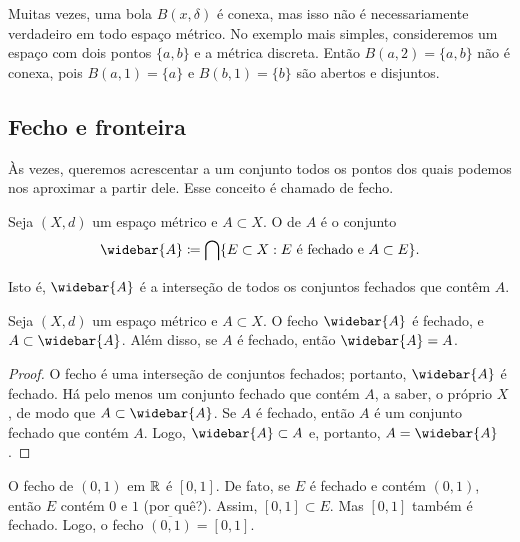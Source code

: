\begin{example}
Muitas vezes, uma bola $B(x,\delta)$ é conexa, mas isso não é necessariamente
verdadeiro em todo espaço métrico.
No exemplo mais simples, consideremos um espaço com dois pontos
$\{ a, b\}$ e a métrica discreta.
Então $B(a,2) = \{ a , b \}$ não é conexa, pois $B(a,1) = \{ a \}$ e
$B(b,1) = \{ b \}$ são abertos e disjuntos.
\end{example}

\subsection{Fecho e fronteira}

Às vezes, queremos acrescentar a um conjunto todos os pontos dos quais
podemos nos aproximar a partir dele. Esse conceito é chamado de fecho.

\begin{defn}
Seja $(X,d)$ um espaço métrico e $A \subset X$.
O \emph{} de $A$ é o conjunto
\begin{equation*}
\widebar{A} \coloneqq \bigcap \{ E \subset X : E \text{ é fechado e } A \subset
E \} .
\end{equation*}
\end{defn}

Isto é,
$\widebar{A}$ é a interseção de todos os conjuntos fechados que contêm $A$.

\begin{prop}
Seja $(X,d)$ um espaço métrico e $A \subset X$. O fecho $\widebar{A}$
é fechado, e $A \subset \widebar{A}$.
Além disso, se $A$ é fechado, então $\widebar{A} = A$.
\end{prop}

\begin{proof}
O fecho é uma interseção de conjuntos fechados; portanto, $\widebar{A}$ é
fechado.
Há pelo menos um conjunto fechado que contém $A$, a saber, o próprio $X$,
de modo que $A \subset \widebar{A}$.
Se $A$ é fechado, então $A$ é um conjunto fechado que contém $A$.
Logo, $\widebar{A} \subset A$ e, portanto, $A = \widebar{A}$.
\end{proof}

\begin{example}
O fecho de $(0,1)$ em ${\mathbb{R}}$ é $[0,1]$. De fato, se
$E$ é fechado e contém $(0,1)$, então $E$ contém $0$ e $1$ (por quê?).
Assim, $[0,1] \subset E$. Mas $[0,1]$ também é fechado.
Logo, o fecho $\overline{(0,1)} = [0,1]$.
\end{example}

